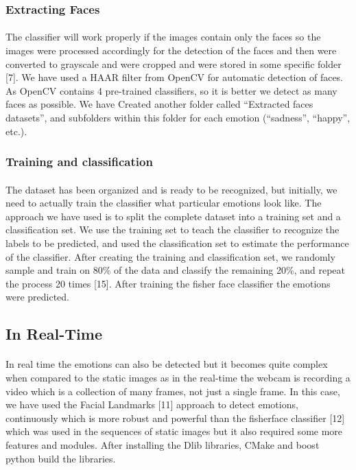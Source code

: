 \documentclass[a4paper,12pt,oneside]{article}
\begin{document}
\subsubsection{Extracting Faces}
\paragraph{}
The classifier will work properly if the images contain
only the faces so the images were processed accordingly
for the detection of the faces and then were converted to
grayscale and were cropped and were stored in some
specific folder [7]. We have used a HAAR filter from
OpenCV for automatic detection of faces. As OpenCV
contains 4 pre-trained classifiers, so it is better we detect
as many faces as possible. We have Created another
folder called “Extracted faces datasets”, and subfolders
within this folder for each emotion (“sadness”, “happy”,
etc.).

\subsubsection{Training and classification}
\paragraph{}
The dataset has been organized and is ready to be
recognized, but initially, we need to actually train the
classifier what particular emotions look like. The
approach we have used is to split the complete dataset
into a training set and a classification set. We use the
training set to teach the classifier to recognize the labels
to be predicted, and used the classification set to estimate
the performance of the classifier. After creating the
training and classification set, we randomly sample and
train on 80\% of the data and classify the remaining 20\%,
and repeat the process 20 times [15]. After training the
fisher face classifier the emotions were predicted.


\subsection{In Real-Time}
\paragraph{}

In real time the emotions can also be detected but it
becomes quite complex when compared to the static
images as in the real-time the webcam is recording a
video which is a collection of many frames, not just a
single frame. In this case, we have used the Facial
Landmarks [11] approach to detect emotions,
continuously which is more robust and powerful than the
fisherface classifier [12] which was used in the
sequences of static images but it also required some more
features and modules. After installing the Dlib libraries,
CMake and boost python build the libraries.
\end{document}
